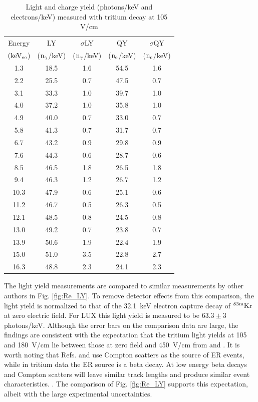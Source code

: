 \begin{table}[h!]
\centering
\begin{tabular}{|c|c|c|c|c|} \hline
Energy 	& 		LY	& 	$\sigma$LY & QY  & $\sigma$QY \\ 
$\rm (keV_{ee}$) & ($\rm n_\gamma$/keV) 	& ($\rm n_\gamma$/keV) & ($\rm n_e$/keV) & ($\rm n_e$/keV) \\ \hline
1.3 	 & 18.5 	 & 1.6 	 & 54.5 	 & 1.6 \\ \hline 
2.2 	 & 25.5 	 & 0.7 	 & 47.5 	 & 0.7 \\ \hline 
3.1 	 & 33.3 	 & 1.0 	 & 39.7 	 & 1.0 \\ \hline 
4.0 	 & 37.2 	 & 1.0 	 & 35.8 	 & 1.0 \\ \hline 
4.9 	 & 40.0 	 & 0.7 	 & 33.0 	 & 0.7 \\ \hline 
5.8 	 & 41.3 	 & 0.7 	 & 31.7 	 & 0.7 \\ \hline 
6.7 	 & 43.2 	 & 0.9 	 & 29.8 	 & 0.9 \\ \hline 
7.6 	 & 44.3 	 & 0.6 	 & 28.7 	 & 0.6 \\ \hline 
8.5 	 & 46.5 	 & 1.8 	 & 26.5 	 & 1.8 \\ \hline 
9.4 	 & 46.3 	 & 1.2 	 & 26.7 	 & 1.2 \\ \hline 
10.3 	 & 47.9 	 & 0.6 	 & 25.1 	 & 0.6 \\ \hline 
11.2 	 & 46.7 	 & 0.5 	 & 26.3 	 & 0.5 \\ \hline 
12.1 	 & 48.5 	 & 0.8 	 & 24.5 	 & 0.8 \\ \hline 
13.0 	 & 49.2 	 & 0.7 	 & 23.8 	 & 0.7 \\ \hline 
13.9 	 & 50.6 	 & 1.9 	 & 22.4 	 & 1.9 \\ \hline 
15.0 	 & 51.0 	 & 3.5 	 & 22.8 	 & 2.7 \\ \hline 
16.3 	 & 48.8 	 & 2.3 	 & 24.1 	 & 2.3 \\ \hline 
\end{tabular}
\caption{Light and charge yield (photons/keV and electrons/keV) measured with tritium decay at 105 V/cm }
\label{table:Yields_100}
\end{table}


The light yield measurements are compared to similar measurements by other authors in Fig. \ref{fig:Re_LY}. To remove detector effects from this comparison, the light yield is normalized to that of the 32.1~keV electron capture decay of $\rm ^{83m} Kr$ at zero electric field. For LUX this light yield is measured to be $ 63.3 \pm 3$ photons/keV. Although the error bars on the comparison data are large, the findings are consistent with the expectation that the tritium light yields at 105 and 180~V/cm lie between those at zero field and 450~V/cm from \cite{Aprile_LY} and \cite{Baudis}. It is worth noting that Refs. \cite{Aprile_LY} and \cite{Baudis} use Compton scatters as the source of ER events, while in tritium data the ER source is a beta decay. At low energy beta decays and Compton scatters will leave similar track lengths and produce similar event characteristics. . The comparison of Fig. \ref{fig:Re_LY} supports this expectation, albeit with the large experimental uncertainties.

